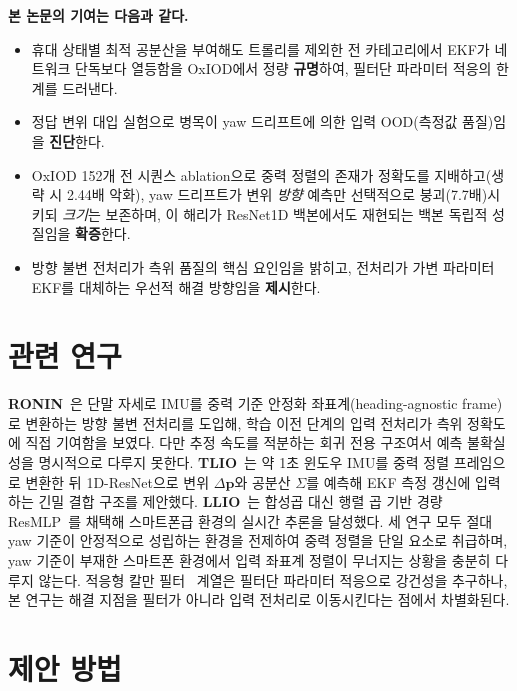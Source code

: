 \documentclass{kcc}
\begin{document}
\noindent\textbf{본 논문의 기여는 다음과 같다.}
\begin{itemize}\setlength{\itemsep}{1pt}
\item 휴대 상태별 최적 공분산을 부여해도 트롤리를 제외한 전 카테고리에서 EKF가 네트워크 단독보다 열등함을 OxIOD에서 정량 \textbf{규명}하여, 필터단 파라미터 적응의 한계를 드러낸다.
\item 정답 변위 대입 실험으로 병목이 yaw 드리프트에 의한 입력 OOD(측정값 품질)임을 \textbf{진단}한다.
\item OxIOD 152개 전 시퀀스 ablation으로 중력 정렬의 존재가 정확도를 지배하고(생략 시 2.44배 악화), yaw 드리프트가 변위 \emph{방향} 예측만 선택적으로 붕괴(7.7배)시키되 \emph{크기}는 보존하며, 이 해리가 ResNet1D 백본에서도 재현되는 백본 독립적 성질임을 \textbf{확증}한다.
\item 방향 불변 전처리가 측위 품질의 핵심 요인임을 밝히고, 전처리가 가변 파라미터 EKF를 대체하는 우선적 해결 방향임을 \textbf{제시}한다.
\end{itemize}


\section{관련 연구}
\textbf{RONIN}~\cite{ronin}은 단말 자세로 IMU를 중력 기준 안정화 좌표계(heading-agnostic frame)로 변환하는 방향 불변 전처리를 도입해, 학습 이전 단계의 입력 전처리가 측위 정확도에 직접 기여함을 보였다. 다만 추정 속도를 적분하는 회귀 전용 구조여서 예측 불확실성을 명시적으로 다루지 못한다. \textbf{TLIO}~\cite{tlio}는 약 1초 윈도우 IMU를 중력 정렬 프레임으로 변환한 뒤 1D-ResNet으로 변위 $\Delta\mathbf{p}$와 공분산 $\Sigma$를 예측해 EKF 측정 갱신에 입력하는 긴밀 결합 구조를 제안했다. \textbf{LLIO}~\cite{llio}는 합성곱 대신 행렬 곱 기반 경량 ResMLP~\cite{resmlp}를 채택해 스마트폰급 환경의 실시간 추론을 달성했다. 세 연구 모두 절대 yaw 기준이 안정적으로 성립하는 환경을 전제하여 중력 정렬을 단일 요소로 취급하며, yaw 기준이 부재한 스마트폰 환경에서 입력 좌표계 정렬이 무너지는 상황을 충분히 다루지 않는다. 적응형 칼만 필터~\cite{akf} 계열은 필터단 파라미터 적응으로 강건성을 추구하나, 본 연구는 해결 지점을 필터가 아니라 입력 전처리로 이동시킨다는 점에서 차별화된다.

\section{제안 방법}
\end{document}
